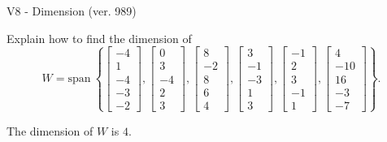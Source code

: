 \begin{exercise}
  \begin{exerciseTitle}V8 - Dimension (ver. 989)\end{exerciseTitle}
  \begin{exerciseStatement}
    Explain how to find the dimension of 
\[W=\mathrm{span}\ \left\{\left[\begin{array}{r}
-4 \\
1 \\
-4 \\
-3 \\
-2
\end{array}\right] , \left[\begin{array}{r}
0 \\
3 \\
-4 \\
2 \\
3
\end{array}\right] , \left[\begin{array}{r}
8 \\
-2 \\
8 \\
6 \\
4
\end{array}\right] , \left[\begin{array}{r}
3 \\
-1 \\
-3 \\
1 \\
3
\end{array}\right] , \left[\begin{array}{r}
-1 \\
2 \\
3 \\
-1 \\
1
\end{array}\right] , \left[\begin{array}{r}
4 \\
-10 \\
16 \\
-3 \\
-7
\end{array}\right]\right\}.\]



  \end{exerciseStatement}
  \begin{exerciseAnswer}
   The dimension of \(W\) is  \(4\).
  


  \end{exerciseAnswer}
\end{exercise}